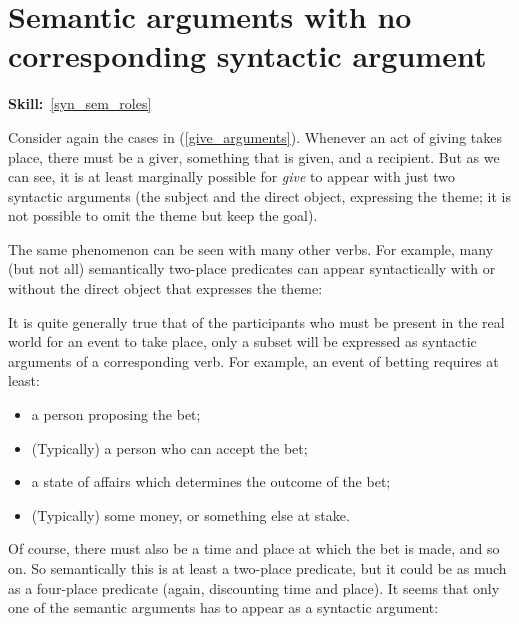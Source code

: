 \documentclass{article}
\begin{document}
\section{Semantic arguments with no corresponding syntactic argument}
\hfill{}\textbf{Skill:}~\ref{syn_sem_roles}

Consider again the cases in (\ref{give_arguments}).
Whenever an act of giving takes place, there must be a giver, something that is given, and a recipient. 
But as we can see, it is at least marginally possible for \emph{give} to appear with just two syntactic arguments (the subject and the direct object, expressing the theme; it is not possible to omit the theme but keep the goal).

The same phenomenon can be seen with many other verbs. For example, many (but not all) semantically two-place predicates can appear syntactically with or without the direct object that expresses the theme:
\begin{exe}
\end{exe}

It is quite generally true that of the participants who must be present in the real world for an event to take place, only a subset will be expressed as syntactic arguments of a corresponding verb.
For example, an event of betting requires at least:
\begin{itemize}
\item a person proposing the bet;
\item (Typically) a person who can accept the bet;
\item a state of affairs which determines the outcome of the bet;
\item (Typically) some money, or something else at stake.
\end{itemize}
Of course, there must also be a time and place at which the bet is made, and so on. 
So semantically this is at least a two-place predicate, but it could be as much as a four-place predicate (again, discounting time and place).
It seems that only one of the semantic arguments has to appear as a syntactic argument:
\begin{exe}
\end{exe}
\end{document}
